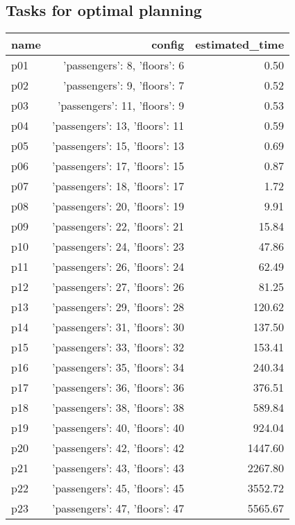 \documentclass{article}
\begin{document}
                                \subsection*{Tasks for optimal planning}
                                
                            \begin{center}
                            \scriptsize
                            \begin{tabular}{@{}l|r|r@{}}
                            name & config & estimated\_time\\\midrule
                              p01&{'passengers': 8, 'floors': 6}&0.50\\
  p02&{'passengers': 9, 'floors': 7}&0.52\\
  p03&{'passengers': 11, 'floors': 9}&0.53\\
  p04&{'passengers': 13, 'floors': 11}&0.59\\
  p05&{'passengers': 15, 'floors': 13}&0.69\\
  p06&{'passengers': 17, 'floors': 15}&0.87\\
  p07&{'passengers': 18, 'floors': 17}&1.72\\
  p08&{'passengers': 20, 'floors': 19}&9.91\\
  p09&{'passengers': 22, 'floors': 21}&15.84\\
  p10&{'passengers': 24, 'floors': 23}&47.86\\
  p11&{'passengers': 26, 'floors': 24}&62.49\\
  p12&{'passengers': 27, 'floors': 26}&81.25\\
  p13&{'passengers': 29, 'floors': 28}&120.62\\
  p14&{'passengers': 31, 'floors': 30}&137.50\\
  p15&{'passengers': 33, 'floors': 32}&153.41\\
  p16&{'passengers': 35, 'floors': 34}&240.34\\
  p17&{'passengers': 36, 'floors': 36}&376.51\\
  p18&{'passengers': 38, 'floors': 38}&589.84\\
  p19&{'passengers': 40, 'floors': 40}&924.04\\
  p20&{'passengers': 42, 'floors': 42}&1447.60\\
  p21&{'passengers': 43, 'floors': 43}&2267.80\\
  p22&{'passengers': 45, 'floors': 45}&3552.72\\
  p23&{'passengers': 47, 'floors': 47}&5565.67\\

\end{tabular}
\end{center}
\end{document}
